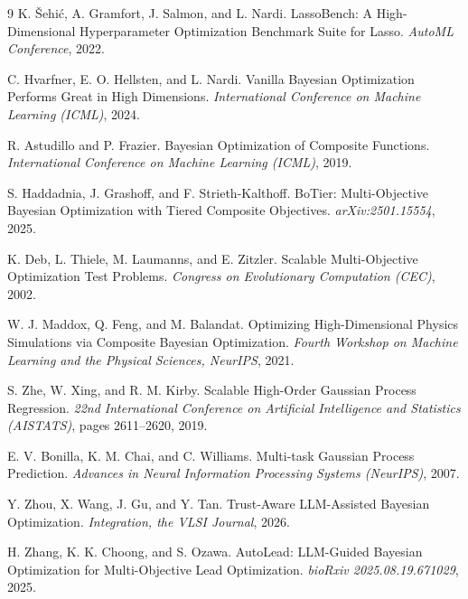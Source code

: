 \documentclass[11pt]{article}
\begin{document}
\begin{thebibliography}{9}
K. \v{S}ehi\'c, A. Gramfort, J. Salmon, and L. Nardi.
\newblock LassoBench: A High-Dimensional Hyperparameter Optimization Benchmark Suite for Lasso.
\newblock \emph{AutoML Conference}, 2022.

C. Hvarfner, E. O. Hellsten, and L. Nardi.
\newblock Vanilla Bayesian Optimization Performs Great in High Dimensions.
\newblock \emph{International Conference on Machine Learning (ICML)}, 2024.

R. Astudillo and P. Frazier.
\newblock Bayesian Optimization of Composite Functions.
\newblock \emph{International Conference on Machine Learning (ICML)}, 2019.

S. Haddadnia, J. Grashoff, and F. Strieth-Kalthoff.
\newblock BoTier: Multi-Objective Bayesian Optimization with Tiered Composite Objectives.
\newblock \emph{arXiv:2501.15554}, 2025.

K. Deb, L. Thiele, M. Laumanns, and E. Zitzler.
\newblock Scalable Multi-Objective Optimization Test Problems.
\newblock \emph{Congress on Evolutionary Computation (CEC)}, 2002.

W. J. Maddox, Q. Feng, and M. Balandat.
\newblock Optimizing High-Dimensional Physics Simulations via Composite Bayesian Optimization.
\newblock \emph{Fourth Workshop on Machine Learning and the Physical Sciences, NeurIPS}, 2021.

S. Zhe, W. Xing, and R. M. Kirby.
\newblock Scalable High-Order Gaussian Process Regression.
\newblock \emph{22nd International Conference on Artificial Intelligence and Statistics (AISTATS)}, pages 2611--2620, 2019.

E. V. Bonilla, K. M. Chai, and C. Williams.
\newblock Multi-task Gaussian Process Prediction.
\newblock \emph{Advances in Neural Information Processing Systems (NeurIPS)}, 2007.

Y. Zhou, X. Wang, J. Gu, and Y. Tan.
\newblock Trust-Aware LLM-Assisted Bayesian Optimization.
\newblock \emph{Integration, the VLSI Journal}, 2026.

H. Zhang, K. K. Choong, and S. Ozawa.
\newblock AutoLead: LLM-Guided Bayesian Optimization for Multi-Objective Lead Optimization.
\newblock \emph{bioRxiv 2025.08.19.671029}, 2025.


\end{thebibliography}
\end{document}
